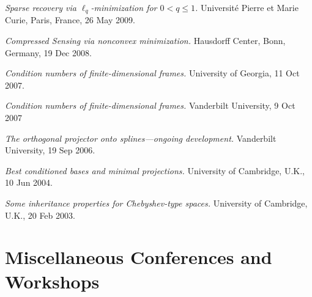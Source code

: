 \documentclass[11pt]{article}
\begin{document}
\item {\sl Sparse recovery via $\ell_q$-minimization for $0<q \le 1$.} Universit\'e Pierre et Marie Curie, Paris, France, 26 May 2009.
\item {\sl Compressed Sensing via nonconvex minimization.} Hausdorff Center, Bonn, Germany, 19 Dec 2008.
\item {\sl Condition numbers of finite-dimensional frames.}
University of Georgia, 11 Oct 2007.
\item {\sl Condition numbers of finite-dimensional frames.} Vanderbilt University,
9 Oct 2007
\item {\sl The orthogonal projector onto splines---ongoing development.}
Vanderbilt University, 19 Sep 2006.
\item  {\sl Best conditioned bases and minimal projections.}
University of Cambridge, U.K., 10 Jun 2004.
\item {\sl Some inheritance properties for Chebyshev-type spaces.}
University of Cambridge, U.K., 20 Feb 2003.
\eitemize



\section{Miscellaneous Conferences and Workshops}
\end{document}
